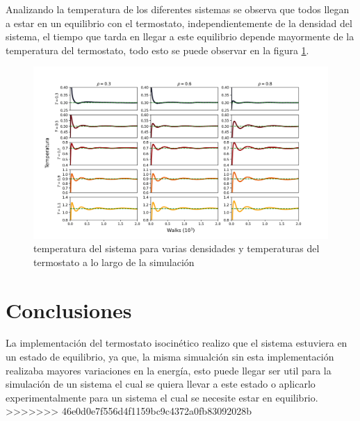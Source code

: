 \documentclass[reprint,amsmath,amssymb,aps,]{revtex4-2}
\begin{document}
Analizando la temperatura de los diferentes sistemas se observa que todos llegan a estar en un equilibrio con el termostato, independientemente
de la densidad del sistema, el tiempo que tarda en llegar a este equilibrio depende mayormente de la temperatura del termostato, todo esto se puede observar
en la figura \ref{fig:temp}.
\begin{figure}[H]
    \hspace{-0.75cm}
    \includegraphics[scale=0.275]{../Graphics/Temp.png}
    \caption{temperatura del sistema para varias densidades y temperaturas del termostato a lo largo de la simulación}
    \label{fig:temp}
    \end{figure}
\section{Conclusiones}
La implementación del termostato isocinético realizo que el sistema estuviera en un estado de equilibrio, ya que, la misma simualción sin esta implementación
realizaba mayores variaciones en la energía, esto puede llegar ser util para la simulación de un sistema el cual se quiera llevar a este estado o aplicarlo experimentalmente
para un sistema el cual se necesite estar en equilibrio.
>>>>>>> 46e0d0e7f556d4f1159bc9c4372a0fb83092028b
\end{document}
